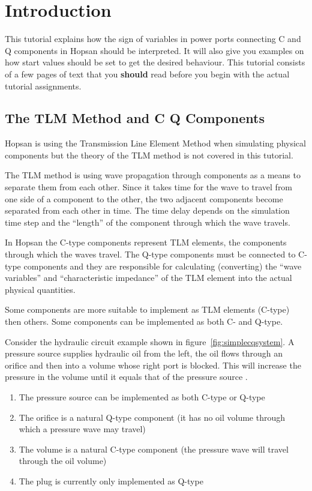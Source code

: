 \documentclass[a4paper,pdftex]{article}
\begin{document}

\section*{Introduction}
This tutorial explains how the sign of variables in power ports connecting C and Q components in Hopsan should be interpreted.
It will also give you examples on how start values should be set to get the desired behaviour.
This tutorial consists of a few pages of text that you \textbf{should} read before you begin with the actual tutorial assignments.

\subsection*{The TLM Method and C Q Components}
Hopsan is using the Transmission Line Element Method when simulating physical components but
the theory of the TLM method is not covered in this tutorial.

The TLM method is using wave propagation through components as a means to separate them from each other.
Since it takes time for the wave to travel from one side of a component to the other, the two adjacent components become separated from each other in time.
The time delay depends on the simulation time step and the \enquote{length} of the component through which the wave travels. 

In Hopsan the C-type components represent TLM elements, the components through which the waves travel.
The Q-type components must be connected to C-type components and they are responsible for calculating (converting) the \enquote{wave variables} and \enquote{characteristic impedance} of the TLM element into the actual physical quantities.

Some components are more suitable to implement as TLM elements (C-type) then others.
Some components can be implemented as both C- and Q-type.

Consider the hydraulic circuit example shown in figure~\ref{fig:simplecqsystem}. 
A pressure source supplies hydraulic oil from the left, the oil flows through an orifice and then into a volume whose right port is blocked.
This will increase the pressure in the volume until it equals that of the pressure source .
\begin{enumerate}
 \item The pressure source can be implemented as both C-type or Q-type
 \item The orifice is a natural Q-type component (it has no oil volume through which a pressure wave may travel)
 \item The volume is a natural C-type component (the pressure wave will travel through the oil volume)
 \item The plug is currently only implemented as Q-type
\end{enumerate}
\end{document}
